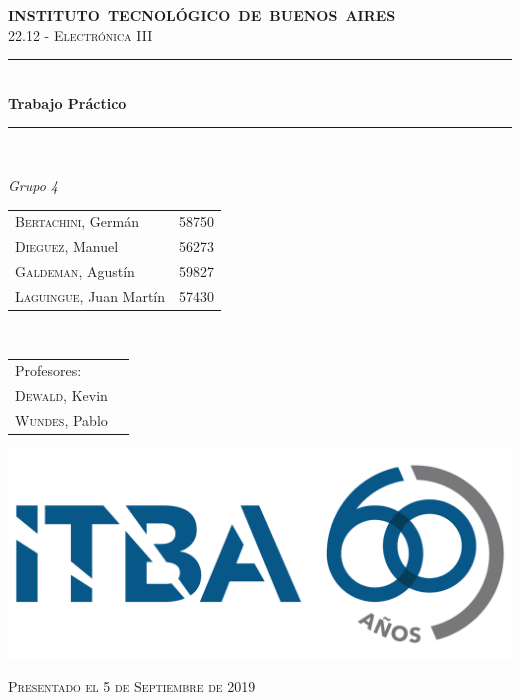 
\begin{titlepage}
    \newcommand{\HRule}{\rule{\linewidth}{0.5mm}}
    \begin{center}
    \mbox{\textsc{\large \bfseries {INSTITUTO TECNOL\'OGICO DE BUENOS AIRES}}}\\[1cm]
    \textsc{\Large 22.12 - Electr\'onica III}\\[0.5cm]
    
    \HRule \\[0.6cm]
    { \Huge \bfseries Trabajo Pr\'actico }\\[0.4cm] 
    \HRule \\[1.5cm]
    
    
    \large
    
    \emph{\Large Grupo 4}\\
    \vspace{10px}
    
    \begin{tabular}{lr}
    \textsc{Bertachini}, Germ\'an  & 58750 \\ 	
    \textsc{Dieguez}, Manuel  & 56273 \\
    \textsc{Galdeman}, Agust\'in  & 59827 \\
    \textsc{Laguingue}, Juan Mart\'in  & 57430 \\
    \end{tabular} \\
    \vspace{20px}
    \begin{tabular}{lr}
    \textsc{}Profesores:\\
    \textsc{Dewald}, Kevin\\
    \textsc{Wundes}, Pablo\\
    \end{tabular}
    \vspace{60px}


    \includegraphics[scale=0.20]{Extras/ITBA.png}    

    
    
    \vspace{30px}
    
    \textsc{\large Presentado el 5 de Septiembre de 2019}\\
    
    \end{center}
    
    \end{titlepage}
